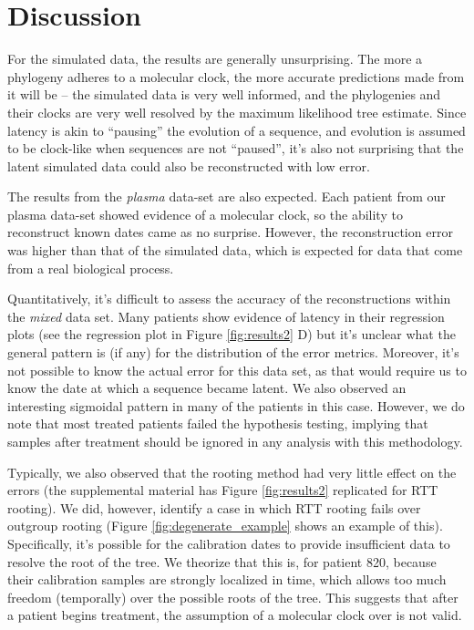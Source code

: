 \section{Discussion} \label{sec:discuss}
For the simulated data, the results are generally unsurprising. 
The more a phylogeny adheres to a molecular clock, the more accurate predictions made from it will be -- the simulated data is very well informed, and the phylogenies and their clocks are very well resolved by the maximum likelihood tree estimate. 
Since latency is akin to ``pausing'' the evolution of a sequence, and evolution is assumed to be clock-like when sequences are not ``paused'', it's also not surprising that the latent simulated data could also be reconstructed with low error. 

The results from the {\em plasma} data-set are also expected. 
Each patient from our plasma data-set showed evidence of a molecular clock, so the ability to reconstruct known dates came as no surprise. 
However, the reconstruction error was higher than that of the simulated data, which is expected for data that come from a real biological process.

Quantitatively, it's difficult to assess the accuracy of the reconstructions within the {\em mixed} data set. 
Many patients show evidence of latency in their regression plots (see the regression plot in Figure \ref{fig:results2} D) but it's unclear what the general pattern is (if any) for the distribution of the error metrics. 
Moreover, it's not possible to know the actual error for this data set, as that would require us to know the date at which a sequence became latent. 
We also observed an interesting sigmoidal pattern in many of the patients in this case.
However, we do note that most treated patients failed the hypothesis testing, implying that samples after treatment should be ignored in any analysis with this methodology.

Typically, we also observed that the rooting method had very little effect on the errors (the supplemental material has Figure \ref{fig:results2} replicated for RTT rooting). 
We did, however, identify a case in which RTT rooting fails over outgroup rooting (Figure \ref{fig:degenerate_example} shows an example of this). 
Specifically, it's possible for the calibration dates to provide insufficient data to resolve the root of the tree. 
We theorize that this is, for patient 820, because their calibration samples are strongly localized in time, which allows too much freedom (temporally) over the possible roots of the tree. 
This suggests that after a patient begins treatment, the assumption of a molecular clock over is not valid.

